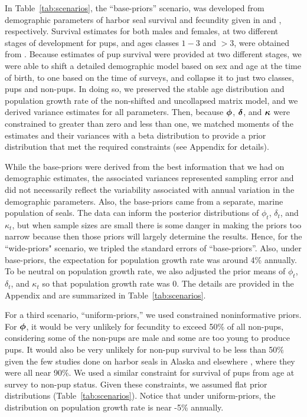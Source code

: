 \documentclass[]{risa}\usepackage[]{graphicx}\usepackage[]{color}
\def\bdelta{\mbox{\boldmath $\delta$}}
\def\bphi{\mbox{\boldmath $\phi$}}
\def\bkappa{\mbox{\boldmath $\kappa$}}
\begin{document}
In Table~\ref{tab:scenarios}, the ``base-priors'' scenario, was developed from demographic parameters of harbor seal survival and fecundity given in \citet{Hast:Smal:Pend:sex:2012} and \citet{Pitc:Calk:biol:1979}, respectively.  Survival estimates for both males and females, at two different stages of development for pups, and ages classes $1-3$ and $>3$, were obtained from \citet{Hast:Smal:Pend:sex:2012}.  Because estimates of pup survival were provided at two different stages, we were able to shift a detailed demographic model based on sex and age at the time of birth, to one based on the time of surveys, and collapse it to just two classes, pups and non-pups.  In doing so, we preserved the stable age distribution and population growth rate of the non-shifted and uncollapsed matrix model, and we derived variance estimates for all parameters.  Then, because $\bphi$, $\bdelta$, and $\bkappa$ were constrained to greater than zero and less than one, we matched moments of the estimates and their variances with a beta distribution to provide a prior distribution that met the required constraints (see Appendix for details).

While the base-priors were derived from the best information that we had on demographic estimates, the associated variances represented sampling error and did not necessarily reflect the variability associated with annual variation in the demographic parameters. Also, the base-priors came from a separate, marine population of seals. The data can inform the posterior distributions of $\phi_t$, $\delta_t$, and $\kappa_t$, but when sample sizes are small there is some danger in making the priors too narrow because then those priors will largely determine the results.  Hence, for the ``wide-priors" scenario, we tripled the standard errors of ``base-priors''.  Also, under base-priors, the expectation for population growth rate was around 4\% annually.  To be neutral on population growth rate, we also adjusted the prior means of $\phi_t$, $\delta_t$, and $\kappa_t$ so that population growth rate was 0.  The details are provided in the Appendix and are summarized in Table~\ref{tab:scenarios}.

For a third scenario, ``uniform-priors,'' we used constrained noninformative priors.  For $\bphi$, it would be very unlikely for fecundity to exceed 50\% of all non-pups, considering some of the non-pups are male and some are too young to produce pups.  It would also be very unlikely for non-pup survival to be less than 50\% given the few studies done on harbor seals in Alaska \citep{Hast:Smal:Pend:sex:2012} and elsewhere \citep{Hark:Heid:comp:1990,Cord:Thom:mark:2014,Mack:Durb:Midd:Thom:baye:2008}, where they were all near 90\%.  We used a similar constraint for survival of pups from age at survey to non-pup status.  Given these constraints, we assumed flat prior distributions (Table~\ref{tab:scenarios}).  Notice that under uniform-priors, the distribution on population growth rate is near -5\% annually. 
\end{document}
